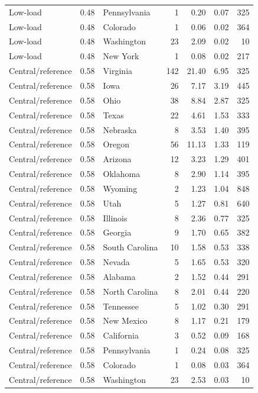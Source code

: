 \documentclass[12pt]{article}
\begin{document}
\begin{landscape}
\begin{longtable}{ll l r r r r}
Low-load & 0.48 & Pennsylvania & 1 & 0.20 & 0.07 & 325 \\
Low-load & 0.48 & Colorado & 1 & 0.06 & 0.02 & 364 \\
Low-load & 0.48 & Washington & 23 & 2.09 & 0.02 & 10 \\
Low-load & 0.48 & New York & 1 & 0.08 & 0.02 & 217 \\
Central/reference & 0.58 & Virginia & 142 & 21.40 & 6.95 & 325 \\
Central/reference & 0.58 & Iowa & 26 & 7.17 & 3.19 & 445 \\
Central/reference & 0.58 & Ohio & 38 & 8.84 & 2.87 & 325 \\
Central/reference & 0.58 & Texas & 22 & 4.61 & 1.53 & 333 \\
Central/reference & 0.58 & Nebraska & 8 & 3.53 & 1.40 & 395 \\
Central/reference & 0.58 & Oregon & 56 & 11.13 & 1.33 & 119 \\
Central/reference & 0.58 & Arizona & 12 & 3.23 & 1.29 & 401 \\
Central/reference & 0.58 & Oklahoma & 8 & 2.90 & 1.14 & 395 \\
Central/reference & 0.58 & Wyoming & 2 & 1.23 & 1.04 & 848 \\
Central/reference & 0.58 & Utah & 5 & 1.27 & 0.81 & 640 \\
Central/reference & 0.58 & Illinois & 8 & 2.36 & 0.77 & 325 \\
Central/reference & 0.58 & Georgia & 9 & 1.70 & 0.65 & 382 \\
Central/reference & 0.58 & South Carolina & 10 & 1.58 & 0.53 & 338 \\
Central/reference & 0.58 & Nevada & 5 & 1.65 & 0.53 & 320 \\
Central/reference & 0.58 & Alabama & 2 & 1.52 & 0.44 & 291 \\
Central/reference & 0.58 & North Carolina & 8 & 2.01 & 0.44 & 220 \\
Central/reference & 0.58 & Tennessee & 5 & 1.02 & 0.30 & 291 \\
Central/reference & 0.58 & New Mexico & 8 & 1.17 & 0.21 & 179 \\
Central/reference & 0.58 & California & 3 & 0.52 & 0.09 & 168 \\
Central/reference & 0.58 & Pennsylvania & 1 & 0.24 & 0.08 & 325 \\
Central/reference & 0.58 & Colorado & 1 & 0.08 & 0.03 & 364 \\
Central/reference & 0.58 & Washington & 23 & 2.53 & 0.03 & 10 \\

\end{longtable}
\end{landscape}
\end{document}

